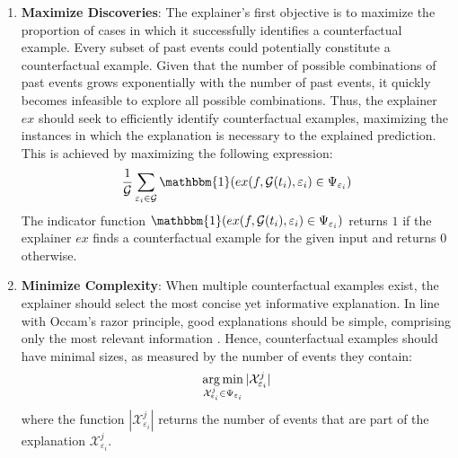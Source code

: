\begin{enumerate}
    \item \textbf{Maximize Discoveries}: The explainer's first objective is to maximize the proportion of cases in which it successfully identifies a counterfactual example. Every subset of past events could potentially constitute a counterfactual example. Given that the number of possible combinations of past events grows exponentially with the number of past events, it quickly becomes infeasible to explore all possible combinations. Thus, the explainer $ex$ should seek to efficiently identify counterfactual examples, maximizing the instances in which the explanation is necessary to the explained prediction. This is achieved by maximizing the following expression:
    \begin{equation}
        \label{e_maxExplanationRate}
        \frac{1}{\mathcal{G}} \sum_{\varepsilon_{i} \in \mathcal{G}} \mathbbm{1}(ex(f, \mathcal{G}(t_i), \varepsilon_{i}) \in \Psi_{\varepsilon_i})
    \end{equation}
    The indicator function $\mathbbm{1}(ex(f, \mathcal{G}(t_i), \varepsilon_{i}) \in \Psi_{\varepsilon_i})$ returns $1$ if the explainer $ex$ finds a counterfactual example for the given input and returns $0$ otherwise.
    \item \textbf{Minimize Complexity}: When multiple counterfactual examples exist, the explainer should select the most concise yet informative explanation. In line with Occam's razor principle, good explanations should be simple, comprising only the most relevant information \cite{yuan_explainability_2020, tan_learning_2022}. Hence, counterfactual examples should have minimal sizes, as measured by the number of events they contain:
    \begin{equation}
        \label{e_minCFExampleSize}
        \operatorname*{arg\,min}_{\mathcal{X}_{\varepsilon_i}^j \in \Psi_{\varepsilon_i}} |\mathcal{X}_{\varepsilon_i}^j|
    \end{equation}
    where the function $|\mathcal{X}_{\varepsilon_i}^j|$ returns the number of events that are part of the explanation $\mathcal{X}_{\varepsilon_i}^j$.
\end{enumerate}




